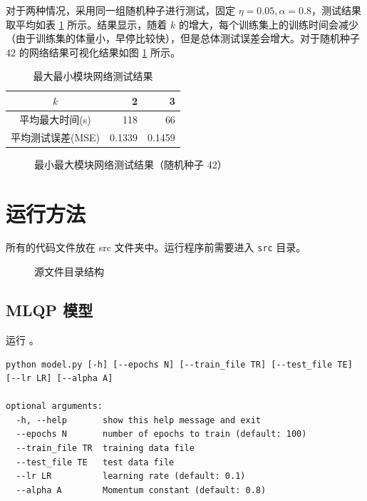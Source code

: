     对于两种情况，采用同一组随机种子进行测试，固定 $\eta=0.05, \alpha=0.8$，测试结果取平均如表 \ref{tab:minmax} 所示。结果显示，随着 $k$ 的增大，每个训练集上的训练时间会减少（由于训练集的体量小，早停比较快），但是总体测试误差会增大。对于随机种子 42 的网络结果可视化结果如图 \ref{fig:boundary_minmax} 所示。

    \begin{table}[H]
        \centering
        \caption{最大最小模块网络测试结果}\label{tab:minmax}
        \begin{tabular}{crr}
            \toprule
            $k$ & 2 & 3 \\
            \midrule
            平均最大时间(s) & 118 & 66 \\
            平均测试误差(MSE) & 0.1339 & 0.1459 \\
            \bottomrule
        \end{tabular}
    \end{table}

    \begin{figure}[H]
        \centering
        \caption{最小最大模块网络测试结果（随机种子 42）}\label{fig:boundary_minmax}
    \end{figure}

    

    \appendix

    \section{运行方法}

    所有的代码文件放在 src 文件夹中。运行程序前需要进入 \texttt{src} 目录。
    
    \begin{figure}[H]
        \centering
        
        \caption{源文件目录结构}\label{fig:files}
    \end{figure}

    \subsection{MLQP 模型}
    运行 。

    \begin{lstlisting}[style=commandshell]
python model.py [-h] [--epochs N] [--train_file TR] [--test_file TE] [--lr LR] [--alpha A]

optional arguments:
  -h, --help       show this help message and exit
  --epochs N       number of epochs to train (default: 100)
  --train_file TR  training data file
  --test_file TE   test data file
  --lr LR          learning rate (default: 0.1)
  --alpha A        Momentum constant (default: 0.8)
    \end{lstlisting}

